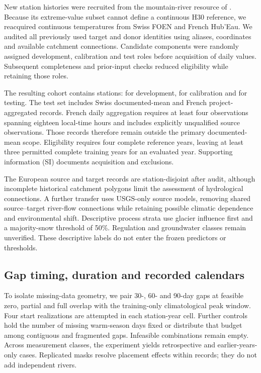 New station histories were recruited from the mountain-river resource of . Because its extreme-value subset cannot define a continuous H30 reference, we reacquired continuous temperatures from Swiss FOEN and French Hub'Eau. We audited all previously used target and donor identities using aliases, coordinates and available catchment connections. Candidate components were randomly assigned development, calibration and test roles before acquisition of daily values. Subsequent completeness and prior-input checks reduced eligibility while retaining those roles.

The resulting cohort contains \RNewStations{} stations: \RNewDevelopment{} for development, \RNewCalibration{} for calibration and \RNewTest{} for testing. The test set includes \RNewSwissTest{} Swiss documented-mean and \RNewFrenchTest{} French project-aggregated records. French daily aggregation requires at least four observations spanning eighteen local-time hours and includes explicitly unqualified source observations. Those records therefore remain outside the primary documented-mean scope. Eligibility requires four complete reference years, leaving at least three permitted complete training years for an evaluated year. Supporting information (SI) documents acquisition and exclusions.

The European source and target records are station-disjoint after audit, although incomplete historical catchment polygons limit the assessment of hydrological connections. A further transfer uses USGS-only source models, removing shared source--target river-flow connections while retaining possible climatic dependence and environmental shift. Descriptive process strata use glacier influence first and a majority-snow threshold of 50\%. Regulation and groundwater classes remain unverified. These descriptive labels do not enter the frozen predictors or thresholds.

\subsection{Gap timing, duration and recorded calendars}

To isolate missing-data geometry, we pair 30-, 60- and 90-day gaps at feasible zero, partial and full overlap with the training-only climatological peak window. Four start realizations are attempted in each station-year cell. Further controls hold the number of missing warm-season days fixed or distribute that budget among contiguous and fragmented gaps. Infeasible combinations remain empty. Across measurement classes, the experiment yields \RControlledCases{} retrospective and \RPriorControlledCases{} earlier-years-only cases. Replicated masks resolve placement effects within records; they do not add independent rivers.

